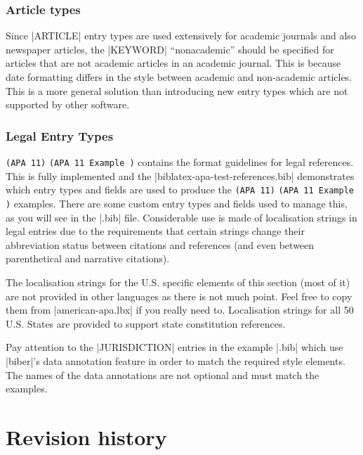 \documentclass{ltxdockit}
\newcommand\apa[2][]{\ifthenelse{\equal{#1}{}}%
                       {\texttt{(APA #2)}}%
                       {\texttt{(APA #2 Example #1)}}}
\begin{document}
\subsubsection{Article types}

Since |ARTICLE| entry types are used extensively for academic journals and
also newspaper articles, the |KEYWORD| ``nonacademic'' should be specified
for articles that are not academic articles in an academic journal. This is
because date formatting differs in the style between academic and
non-academic articles. This is a more general solution than introducing new
entry types which are not supported by other software.

\subsubsection{Legal Entry Types}

\apa{11} contains the format guidelines for legal references. This is fully
implemented and the |biblatex-apa-test-references.bib| demonstrates which
entry types and fields are used to produce the \apa{11} examples. There are
some custom entry types and fields used to manage this, as you will see in
the |.bib| file. Considerable use is made of localisation strings in legal
entries due to the requirements that certain strings change their
abbreviation status between citations and references (and even between
parenthetical and narrative citations).

The localisation strings for the U.S. specific elements of this section
(most of it) are not provided in other languages as there is not much
point. Feel free to copy them from |american-apa.lbx| if you really need
to. Localisation strings for all 50 U.S. States are provided to support
state constitution references.

Pay attention to the |JURISDICTION| entries in the example |.bib| which use
|biber|'s data annotation feature in order to match the required style
elements. The names of the data annotations are not optional and must match
the examples.

\section{Revision history}\label{rev}
\end{document}
